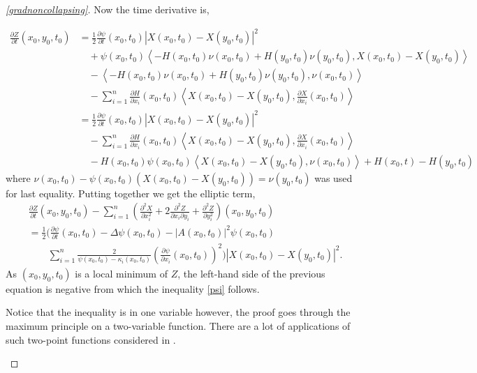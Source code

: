 \begin{proof}[\cref{gradnoncollapsing}]
    Now the time derivative is,
    
    \begin{align*}
        \frac{\partial Z}{\partial t}(x_{0},y_{0},t_{0}) & = \frac{1}{2} \frac{\partial \psi}{\partial t}(x_{0},t_{0})|X(x_{0},t_{0})-X(y_{0},t_{0})|^{2} \\
        & \quad + \psi(x_{0},t_{0}) \left< -H(x_{0},t_{0})\nu(x_{0},t_{0})+H(y_{0},t_{0})\nu(y_{0},t_{0}), X(x_{0},t_{0})-X(y_{0},t_{0}) \right>  \\
        &\quad - \left< -H(x_{0},t_{0})\nu(x_{0},t_{0})+H(y_{0},t_{0})\nu(y_{0},t_{0}), \nu (x_{0},t_{0}) \right> \\
        & \quad - \sum_{i=1}^{n} \frac{\partial H}{\partial x_{i}}(x_{0},t_{0}) \left< X(x_{0},t_{0})-X(y_{0},t_{0}), \frac{\partial X}{\partial x_{i}}(x_{0},t_{0}) \right> \\
        & = \frac{1}{2} \frac{\partial \psi}{\partial t}(x_{0},t_{0})|X(x_{0},t_{0})-X(y_{0},t_{0})|^{2} \\
        & \quad - \sum_{i=1}^{n} \frac{\partial H}{\partial x_{i}}(x_{0},t_{0})\left< X(x_{0},t_{0})-X(y_{0},t_{0}), \frac{\partial X}{\partial x_{i}}(x_{0},t_{0}) \right> \\ 
        & \quad -H(x_{0},t_{0})\psi(x_{0},t_{0})\left< X(x_{0},t_{0})-X(y_{0},t_{0}), \nu(x_{0},t_{0}) \right> + H(x_{0},t)-H(y_{0},t_{0})
    \end{align*}
    where $ \nu(x_{0},t_{0}) - \psi(x_{0},t_{0})(X(x_{0},t_{0})-X(y_{0},t_{0})) =\nu(y_{0},t_{0})  $ was used for last equality. Putting together we get the elliptic term, \begin{align*}
        & \frac{\partial Z}{\partial t}(x_{0},y_{0},t_{0}) - \sum_{i=1}^{n}\left( \frac{\partial^{2} X}{\partial x_{i}^{2}} + 2 \frac{\partial^{2}Z}{\partial x_{i}\partial y_{i}} + \frac{\partial^{2} Z}{\partial y_{i}^{2}} \right)(x_{0},y_{0},t_{0}) \\
        & = \frac{1}{2}\bigg( \frac{\partial \psi}{\partial t}(x_{0},t_{0}) - \Delta \psi(x_{0},t_{0}) - |A(x_{0},t_{0})|^{2} \psi(x_{0},t_{0}) \\
        & \qquad \sum_{i=1}^{n} \frac{2}{\psi(x_{0},t_{0})-\kappa_{i}(x_{0},t_{0})}\left( \frac{\partial \psi}{\partial x_{i}}(x_{0},t_{0}) \right)^{2} \bigg)|X(x_{0},t_{0})-X(y_{0},t_{0})|^{2}.
    \end{align*}
    As $ (x_{0},y_{0},t_{0}) $ is a local minimum of $ Z $, the left-hand side of the previous equation is negative from which the inequality \cref{psi} follows. 
    
    
    \begin{remark}
        Notice that the inequality is in one variable however, the proof goes through the maximum principle on a two-variable function. There are a lot of applications of such two-point functions considered in \cite{brendle2014two,andrews2014moduli}.
    \end{remark}

\end{proof}
